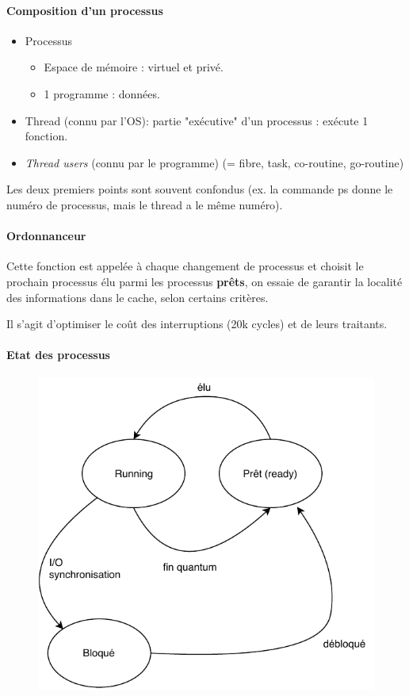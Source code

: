 \documentclass[11pt]{article}
\begin{document}
\paragraph{Composition d'un processus}
\begin{itemize}
    \item Processus
    \begin{itemize}
        \item Espace de mémoire : virtuel et privé.
        \item 1 programme : données.
    \end{itemize}
    \item Thread (connu par l'OS): partie "exécutive" d'un processus : exécute 1 fonction.
    \item \textit{Thread users} (connu par le programme) (= fibre, task, co-routine, go-routine)
\end{itemize}

Les deux premiers points sont souvent confondus (ex. la commande ps donne le numéro de processus, mais le thread a le même numéro).

\paragraph{Ordonnanceur}
Cette fonction est appelée à chaque changement de processus et choisit le prochain processus élu parmi les processus \textbf{prêts}, on essaie de garantir la localité des informations dans le cache, selon certains critères.

Il s'agit d'optimiser le coût des interruptions (20k cycles) et de leurs traitants.

\paragraph{Etat des processus}
\begin{figure}[ht]
    \centering
    \includegraphics{img/c2-process-states.pdf}
\end{figure}
\end{document}
